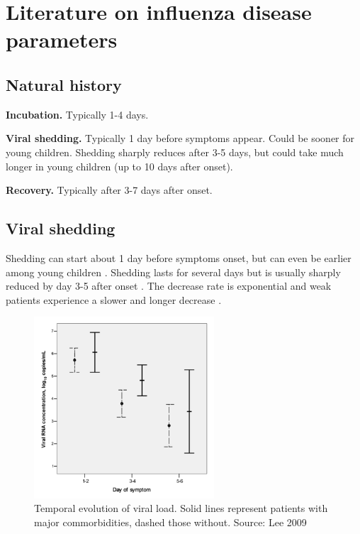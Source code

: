 \documentclass[11pt, onecolumn]{article}
\begin{document}
\section{Literature on influenza disease parameters}

\subsection{Natural history}

\textbf{Incubation.} Typically 1-4 days.

\textbf{Viral shedding.} Typically 1 day before symptoms appear. Could be sooner for young children. Shedding sharply reduces after 3-5 days, but could take much longer in young children (up to 10 days after onset). 

\textbf{Recovery.} Typically after 3-7 days after onset.


\subsection{Viral shedding}

Shedding can start about 1 day before symptoms onset, but can even be earlier among young children \cite{CDC:2011wq}. Shedding lasts for several days but is usually sharply reduced by day 3-5 after onset \cite{CDC:2011wq}. The decrease rate is exponential and weak patients experience a slower and longer decrease \cite{Lee:2009dc}.

\begin{figure}[!ht]
\centering
    \includegraphics[angle=0,width=0.6\textwidth]{figures/VL_Lee.png}
\caption{Temporal evolution of viral load. Solid lines represent patients with major commorbidities, dashed those without. Source: Lee 2009 \cite{Lee:2009dc}}
\label{fig:VL_Lee}
\end{figure}
\end{document}
